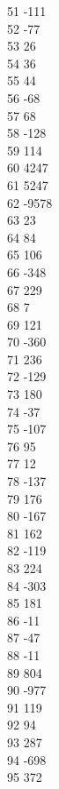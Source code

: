 { 51	-111 \\
 52	-77 \\
 53	26 \\
 54	36 \\
 55	44 \\
 56	-68 \\
 57	68 \\
 58	-128 \\
 59	114 \\
 60	4247 \\
 61	5247 \\
 62	-9578 \\
 63	23 \\
 64	84 \\
 65	106 \\
 66	-348 \\
 67	229 \\
 68	7 \\
 69	121 \\
 70	-360 \\
 71	236 \\
 72	-129 \\
 73	180 \\
 74	-37 \\
 75	-107 \\
 76	95 \\
 77	12 \\
 78	-137 \\
 79	176 \\
 80	-167 \\
 81	162 \\
 82	-119 \\
 83	224 \\
 84	-303 \\
 85	181 \\
 86	-11 \\
 87	-47 \\
 88	-11 \\
 89	804 \\
 90	-977 \\
 91	119 \\
 92	94 \\
 93	287 \\
 94	-698 \\
 95	372 \\
}
